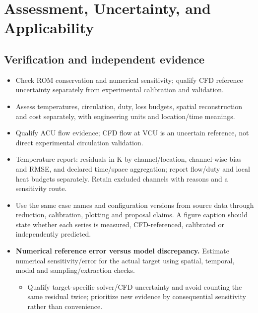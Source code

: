 \section{Assessment, Uncertainty, and Applicability}\label{sec:assessment-uncertainty-and-applicability}

\subsection{Verification and independent evidence}\label{subsec:verification-and-independent-evidence}
\begin{itemize}[leftmargin=*]
\item Check ROM conservation and numerical sensitivity; qualify CFD reference uncertainty separately from experimental calibration and validation.
\item Assess temperatures, circulation, duty, loss budgets, spatial reconstruction and cost separately, with engineering units and location/\allowbreak{}time meanings.
\item Qualify ACU flow evidence; CFD flow at VCU is an uncertain reference, not direct experimental circulation validation.
\item Temperature report: residuals in K by channel/\allowbreak{}location, channel-wise bias and RMSE, and declared time/\allowbreak{}space aggregation; report flow/\allowbreak{}duty and local heat budgets separately. Retain excluded channels with reasons and a sensitivity route.
\item Use the same case names and configuration versions from source data through reduction, calibration, plotting and proposal claims. A figure caption should state whether each series is measured, CFD-referenced, calibrated or independently predicted.

\item {}\textbf{Numerical reference error versus model discrepancy.} Estimate numerical sensitivity/\allowbreak{}error for the actual target using spatial, temporal, modal and sampling/\allowbreak{}extraction checks.
\begin{itemize}
\item Qualify target-specific solver/\allowbreak{}CFD uncertainty and avoid counting the same residual twice; prioritize new evidence by consequential sensitivity rather than convenience.
\end{itemize}
\end{itemize}

